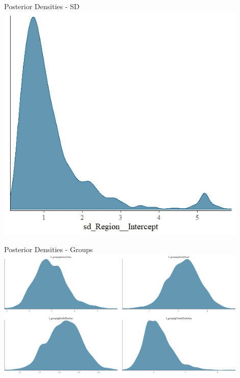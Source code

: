 \documentclass{beamer}
\begin{document}
\begin{frame}{Posterior Densities - SD}
    \includegraphics[width=0.9\textwidth]{plots/sd_vary_intercept_grouping_density.jpeg}
\end{frame}

\begin{frame}{Posterior Densities - Groups}
    \includegraphics[width=0.9\textwidth]{plots/vary_intercept_grouping_density_groups_only.png}
\end{frame}
\end{document}
